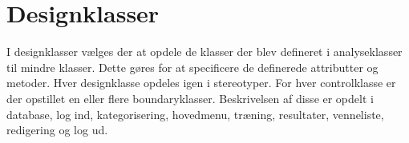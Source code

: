 \section{Designklasser}
I designklasser vælges der at opdele de klasser der blev defineret i analyseklasser til mindre klasser. Dette gøres for at specificere de definerede attributter og metoder. Hver designklasse opdeles igen i stereotyper. For hver controlklasse er der opstillet en eller flere boundaryklasser. Beskrivelsen af disse er opdelt i database, log ind, kategorisering, hovedmenu, træning, resultater, venneliste, redigering og log ud. 